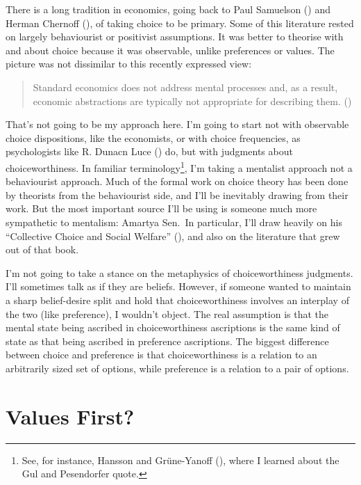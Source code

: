 \documentclass[
  11pt,
  letterpaper,
  DIV=11,
  numbers=noendperiod,
  twoside]{scrartcl}
\begin{document}
There is a long tradition in economics, going back to Paul Samuelson
() and Herman Chernoff
(), of taking choice to be primary.
Some of this literature rested on largely behaviourist or positivist
assumptions. It was better to theorise with and about choice because it
was observable, unlike preferences or values. The picture was not
dissimilar to this recently expressed view:

\begin{quote}
Standard economics does not address mental processes and, as a result,
economic abstractions are typically not appropriate for describing them.
()
\end{quote}

That's not going to be my approach here. I'm going to start not with
observable choice dispositions, like the economists, or with choice
frequencies, as psychologists like R. Dunacn Luce
() do, but with judgments about
choiceworthiness. In familiar terminology\footnote{See, for instance,
  Hansson and Grüne-Yanoff (), where
  I learned about the Gul and Pesendorfer quote.}, I'm taking a
mentalist approach not a behaviourist approach. Much of the formal work
on choice theory has been done by theorists from the behaviourist side,
and I'll be inevitably drawing from their work. But the most important
source I'll be using is someone much more sympathetic to mentalism:
Amartya Sen.~In particular, I'll draw heavily on his ``Collective Choice
and Social Welfare'' (),
and also on the literature that grew out of that book.

I'm not going to take a stance on the metaphysics of choiceworthiness
judgments. I'll sometimes talk as if they are beliefs. However, if
someone wanted to maintain a sharp belief-desire split and hold that
choiceworthiness involves an interplay of the two (like preference), I
wouldn't object. The real assumption is that the mental state being
ascribed in choiceworthiness ascriptions is the same kind of state as
that being ascribed in preference ascriptions. The biggest difference
between choice and preference is that choiceworthiness is a relation to
an arbitrarily sized set of options, while preference is a relation to a
pair of options.

\section{Values First?}\label{sec-values}
\end{document}
